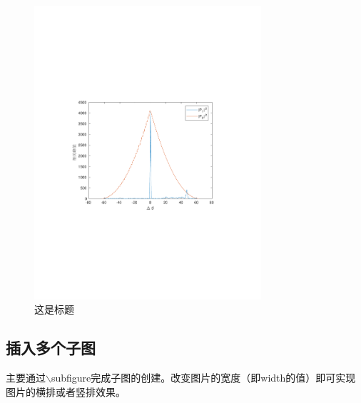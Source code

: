 \begin{figure}[h]
 \centering
 \includegraphics[width=0.75\textwidth]{chapters/figures/correlation_P.pdf}
 \caption{这是标题}\label{fig:correlation_P1_P2}
\end{figure}
\subsection{插入多个子图}
主要通过$\backslash$subfigure完成子图的创建。改变图片的宽度（即width的值）即可实现图片的横排或者竖排效果。

